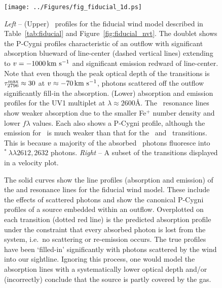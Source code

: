 \documentclass[12pt,preprint]{aastex}
\begin{document}
\begin{figure}
\texttt{[image: ../Figures/fig\_fiducial\_1d.ps]}
\caption{
{\it Left} -- (Upper) \mgiid\ profiles for the fiducial wind model
described in Table~\ref{tab:fiducial} and
Figure~\ref{fig:fiducial_nvt}.  The doublet shows the P-Cygni profiles
characteristic of an outflow with significant absorption blueward of
line-center (dashed vertical lines) extending to $v = -1000\, {\rm km~s^{-1}}$
and significant emission redward of line-center.  Note
that even though the peak optical depth of the  transitions
is $\tau_{2796}^{\rm max} \approx 30$ at $v \approx -70 \, {\rm km~s^{-1}}$,
photons scattered off the outflow significantly fill-in the absorption.
(Lower)  absorption and emission profiles for the UV1
multiplet at $\lambda \approx 2600$\AA.  The \feiid\ resonance lines 
show weaker absorption due to the smaller Fe$^+$ number density and
lower $f\lambda$ values.  Each also shows a P-Cygni profile, although
the emission for \feiia\ is much weaker than that for the
\feiib\ and \mgiid\ transitions.  This is because a majority of the
absorbed \feiia\ photons fluoresce into
$^*~\lambda\lambda 2612, 2632$ photons.
{\it Right} -- A subset of the transitions displayed in a velocity
plot.
}
\label{fig:fiducial_1d}
\end{figure}

\begin{figure}
\caption{
The solid curves show the line profiles (absorption and emission) of
the  and  resonance lines for the fiducial wind
model.  These include the effects of scattered photons and show the
canonical P-Cygni profiles of a source 
embedded within an outflow.  Overplotted on each transition (dotted
red line) is
the predicted absorption profile under the constraint that every
absorbed photon is lost from the system, i.e.\ no scattering or
re-emission occurs.   The true profiles have been `filled-in' 
significantly with photons scattered by the wind into our sightline.  Ignoring this
process, one would model the absorption lines with a systematically lower
optical depth and/or (incorrectly) conclude that the source is partly covered by the
gas.  
}
\label{fig:noemiss}
\end{figure}
\end{document}
